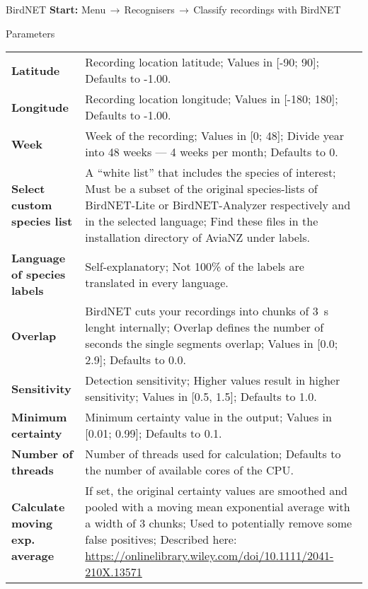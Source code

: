 \documentclass[final,hyperref={pdfpagelabels=false}]{beamer}
\begin{document}
\begin{frame}[fragile]{}
\begin{columns}[t]
      \begin{column}{.43\linewidth}
	\begin{block}{BirdNET}
	\textbf{Start:} Menu$\,\to\,$Recognisers$\,\to\,$Classify recordings with BirdNET\\
	\begin{subblock}{Parameters}
{\renewcommand{\arraystretch}{1.2}
	\begin{tabular}{p{7em}p{25em}}
		\textbf{Latitude} & Recording location latitude; Values in [-90; 90]; Defaults to -1.00.\\
\textbf{Longitude} & Recording location longitude; Values in [-180; 180]; Defaults to -1.00.\\
	\textbf{Week} & Week of the recording; Values in [0; 48]; Divide year into 48 weeks — 4 weeks per month; Defaults to 0.\\
\textbf{Select custom species list} & A ``white list'' that includes the species of interest; Must be a subset of the original species-lists of BirdNET-Lite or BirdNET-Analyzer respectively and in the selected language; Find these files in the installation directory of AviaNZ under labels.\\ 
\textbf{Language of species labels} & Self-explanatory; Not 100\% of the labels are translated in every language.\\
\textbf{Overlap} & BirdNET cuts your recordings into chunks of \SI{3}{\second} lenght internally; Overlap defines the number of seconds the single segments overlap; Values in [0.0; 2.9]; Defaults to 0.0.\\
\textbf{Sensitivity} & Detection sensitivity; Higher values result in higher sensitivity; Values in [0.5, 1.5]; Defaults to 1.0.\\
\textbf{Minimum certainty} & Minimum certainty value in the output; Values in [0.01; 0.99]; Defaults to 0.1.\\
\textbf{Number of threads} & Number of threads used for calculation; Defaults to the number of available cores of the CPU.\\
\textbf{Calculate moving exp. average} & If set, the original certainty values are smoothed and pooled with a moving mean exponential average with a width of 3 chunks; Used to potentially remove some false positives; Described here: \url{https://onlinelibrary.wiley.com/doi/10.1111/2041-210X.13571}\\

\end{tabular}}
\end{subblock}
\end{block}
\end{column}
\end{columns}
\end{frame}
\end{document}
